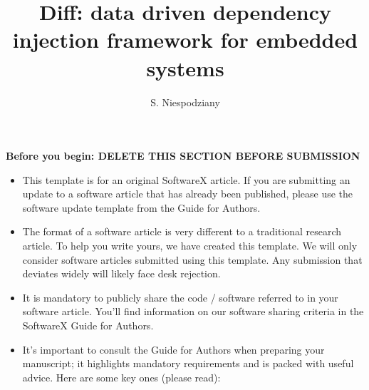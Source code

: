 \documentclass[preprint,12pt, a4paper]{elsarticle}
\begin{document}
\renewcommand{\labelenumii}{\arabic{enumi}.\arabic{enumii}}

\begin{frontmatter}



    \title{Diff: data driven dependency injection framework for embedded systems}


    \author{S. Niespodziany}

    \address{Institute of Computer Science, Warsaw University of Technology,  plac Politechniki 1, 00-661 Warsaw, PL}

    \textbf{Before you begin: DELETE THIS SECTION BEFORE SUBMISSION}\\

    \begin{itemize}
        \item This template is for an original SoftwareX article. If you are submitting an update to a software article that has already been published, please use the software update template from the Guide for Authors.
        \item The format of a software article is very different to a traditional research article. To help you write yours, we have created this template. We will only consider software articles submitted using this template. Any submission that deviates widely will likely face desk rejection.
        \item It is mandatory to publicly share the code / software referred to in your software article. You’ll find information on our software sharing criteria in the SoftwareX Guide for Authors.
        \item It’s important to consult the Guide for Authors when preparing your manuscript; it highlights mandatory requirements and is packed with useful advice. Here are some key ones (please read):



\end{itemize}
\end{frontmatter}
\end{document}

